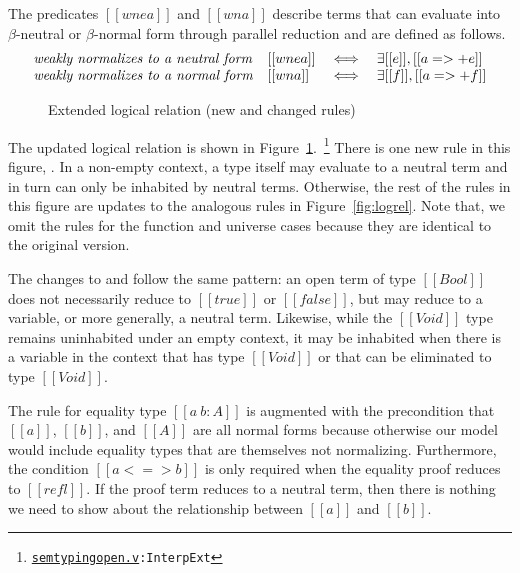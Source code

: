 \documentclass[\ifpublic nolinenum\else\fi,online,OA]{jfp}
\newcommand{\scw}[1]{}
\newcommand{\dotv}[2]{\href{#1}{\texttt{#1}}{\texttt{:#2}}}
\theoremstyle{definition}
\begin{document}
The predicates $[[wne a]]$ and $[[wn
a]]$ describe terms that can evaluate into $\beta$-neutral or
$\beta$-normal form through parallel reduction and are defined as
follows.
\[
\begin{array}{llcl}
\mbox{\emph{weakly normalizes to a neutral form}} & [[wne a]] &\iff& \exists [[e]], [[a =>+ e]] \\
\mbox{\emph{weakly normalizes to a normal form}}  & [[wn a]]  &\iff& \exists [[f]], [[a =>+ f]] \\
\end{array}
\]

\begin{figure}[H]
  \caption{Extended logical relation (new and changed rules) }
  \label{fig:logrelopen}
\end{figure}

The updated logical relation is shown in
Figure~\ref{fig:logrelopen}.~\footnote{\dotv{semtypingopen.v}{InterpExt}}
There is one new rule in this figure, . In a non-empty context, a
type itself may evaluate to a neutral term and in turn can only be inhabited
by neutral terms.  Otherwise, the rest of the rules in this figure are updates
to the analogous rules in Figure~\ref{fig:logrel}. Note that, we omit the
rules for the function and universe cases because they are identical to the
original version.

The changes to  and 
follow the same pattern: an open term of type $[[Bool]]$ does not necessarily
reduce to $[[true]]$ or $[[false]]$, but may reduce to a variable, or more
generally, a neutral term. Likewise, while the $[[Void]]$ type remains
uninhabited under an empty context, it may be inhabited when there is a
variable in the context that has type $[[Void]]$ or that can be eliminated to
type $[[Void]]$.

\scw{Cassia didn't understand this part}
The rule for equality type $[[a ~ b : A]]$ is augmented with the precondition that
$[[a]]$, $[[b]]$, and $[[A]]$ are all normal forms because
otherwise our model would include equality types that are themselves
not normalizing.
Furthermore, the condition $[[a <=> b]]$ is only
required when the equality proof reduces to $[[refl]]$. If the proof
term reduces to a neutral term, then there is nothing we need to show
about the relationship between $[[a]]$ and $[[b]]$.
\end{document}
